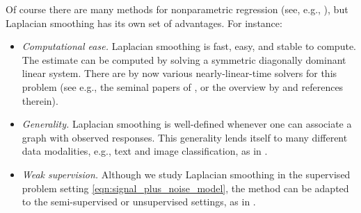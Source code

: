 \documentclass[twoside]{article}
\newcommand{\1}{\mathbf{1}}
\newcommand{\wh}[1]{\widehat{#1}}
\theoremstyle{definition}
\theoremstyle{remark}
\begin{document}
Of course there are many methods for nonparametric regression (see, e.g., \citet{gyorfi2006,wasserman2006,tsybakov2008_book}), but Laplacian smoothing has its own set of advantages. For instance:
\begin{itemize}
	\item \emph{Computational ease.} Laplacian smoothing is fast, easy, and stable to compute. The estimate \smash{$\wh{f}$} can be computed by solving a symmetric diagonally dominant linear system. There are by now various nearly-linear-time solvers for this problem (see e.g., the seminal papers of \citet{spielman2011,spielman2013,spielman2014}, or the overview by \citet{vishnoi2012} and references therein).
	\item \emph{Generality.} Laplacian smoothing is well-defined whenever one can associate a graph with observed responses. This generality lends itself to many different data modalities, e.g., text and image classification, as in \citet{kondor2002,belkin03a,belkin2006}.
	\item \emph{Weak supervision.} Although we study Laplacian smoothing in the supervised problem setting \eqref{eqn:signal_plus_noise_model}, the method can be adapted to the semi-supervised or unsupervised settings, as in \citet{zhu2003semisupervised,zhou2005learning,nadler09}. %
\end{itemize}
\end{document}
